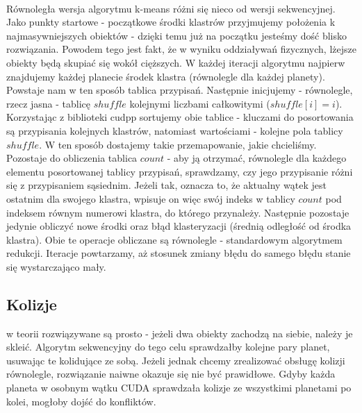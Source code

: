 \paragraph{} Równoległa wersja algorytmu k-means różni się nieco od wersji sekwencyjnej. Jako punkty startowe - początkowe środki klastrów przyjmujemy położenia k najmasywniejszych obiektów - dzięki temu już na początku jesteśmy dość blisko rozwiązania. Powodem tego jest fakt, że w wyniku oddziaływań fizycznych, lżejsze obiekty będą skupiać się wokół cięższych. W każdej iteracji algorytmu najpierw znajdujemy każdej planecie środek klastra (równolegle dla każdej planety). Powstaje nam w ten sposób tablica przypisań. Następnie inicjujemy - równolegle, rzecz jasna - tablicę $shuffle$ kolejnymi liczbami całkowitymi ($shuffle[i]=i$). Korzystając z biblioteki cudpp sortujemy obie tablice - kluczami do posortowania są przypisania kolejnych klastrów, natomiast wartościami - kolejne pola tablicy $shuffle$. W ten sposób dostajemy takie przemapowanie, jakie chcieliśmy. Pozostaje do obliczenia tablica $count$ - aby ją otrzymać, równolegle dla każdego elementu posortowanej tablicy przypisań, sprawdzamy, czy jego przypisanie różni się z przypisaniem sąsiednim. Jeżeli tak, oznacza to, że aktualny wątek jest ostatnim dla swojego klastra, wpisuje on więc swój indeks w tablicy $count$ pod indeksem równym numerowi klastra, do którego przynależy. Następnie pozostaje jedynie obliczyć nowe środki oraz błąd klasteryzacji (średnią odległość od środka klastra). Obie te operacje obliczane są równolegle - standardowym algorytmem redukcji\cite{reduction}. Iteracje powtarzamy, aż stosunek zmiany błędu do samego błędu stanie się wystarczająco mały.

\subsection{Kolizje} w teorii rozwiązywane są prosto - jeżeli dwa obiekty zachodzą na siebie, należy je skleić. Algorytm sekwencyjny do tego celu sprawdzałby kolejne pary planet, usuwając te kolidujące ze sobą. Jeżeli jednak chcemy zrealizować obsługę kolizji równolegle, rozwiązanie naiwne okazuje się nie być prawidłowe. Gdyby każda planeta w osobnym wątku CUDA sprawdzała kolizje ze wszystkimi planetami po kolei, mogłoby dojść do konfliktów.

